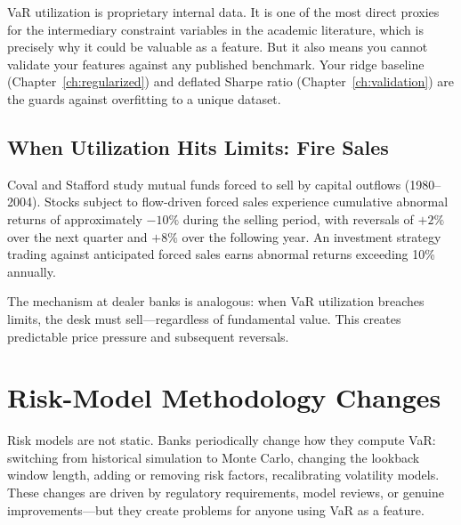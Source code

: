 \begin{warning}
VaR utilization is proprietary internal data.  It is one of the most
direct proxies for the intermediary constraint variables in the academic
literature, which is precisely why it could be valuable as a feature.
But it also means you cannot validate your features against any
published benchmark.  Your ridge baseline
(Chapter~\ref{ch:regularized}) and deflated Sharpe ratio
(Chapter~\ref{ch:validation}) are the guards against overfitting to a
unique dataset.
\end{warning}

\subsection{When Utilization Hits Limits: Fire Sales}

\begin{keyresult}
Coval and Stafford study mutual funds forced to sell by capital outflows
(1980--2004).  Stocks subject to flow-driven forced sales experience
cumulative abnormal returns of approximately $-10\%$ during the selling
period, with reversals of $+2\%$ over the next quarter and $+8\%$ over
the following year.  An investment strategy trading against anticipated
forced sales earns abnormal returns exceeding 10\% annually.

The mechanism at dealer banks is analogous: when VaR utilization breaches
limits, the desk must sell---regardless of fundamental value.  This
creates predictable price pressure and subsequent reversals.
\end{keyresult}


\section{Risk-Model Methodology Changes}
\label{sec:methodology-changes}

Risk models are not static.  Banks periodically change how they compute
VaR: switching from historical simulation to Monte Carlo, changing the
lookback window length, adding or removing risk factors, recalibrating
volatility models.  These changes are driven by regulatory requirements,
model reviews, or genuine improvements---but they create problems for
anyone using VaR as a feature.


